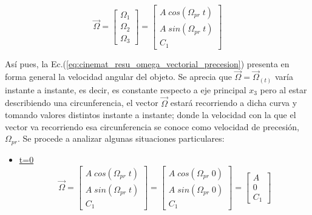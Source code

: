 \documentclass[oneside,a4paper,english,links]{amca}
\begin{document}
\begin{equation}
    \vec{\Omega}=
\begin{bmatrix}
\Omega_1\\
\Omega_2\\
\Omega_3
\end{bmatrix}=
\begin{bmatrix}
A \;cos\left(\Omega_{pr}\;t\right)\\
A \;sin\left(\Omega_{pr}\;t\right)\\
C_1
\end{bmatrix}    
\label{eq:cinemat_resu_omega_vectorial_precesion}
\end{equation}

As\'i pues, la Ec.(\ref{eq:cinemat_resu_omega_vectorial_precesion}) presenta en forma general la velocidad angular del objeto. Se aprecia que $\vec{\Omega}=\vec{\Omega}_{(t)}$ var\'ia instante a instante, es decir, es constante respecto a eje principal $x_3$ pero al estar describiendo una circunferencia, el vector $\vec{\Omega}$ estar\'a recorriendo a dicha curva y tomando valores distintos instante a instante; donde la velocidad con la que el vector va recorriendo esa circunferencia se conoce como velocidad de precesi\'on, $\Omega_{pr}$. Se procede a analizar algunas situaciones particulares:


\begin{itemize}
    \item \underline{t=0}\\
\begin{equation}
    \vec{\Omega}=
\begin{bmatrix}
A \;cos\left(\Omega_{pr}\;t\right)\\
A \;sin\left(\Omega_{pr}\;t\right)\\
C_1
\end{bmatrix}=
\begin{bmatrix}
A \;cos\left(\Omega_{pr}\;0\right)\\
A \;sin\left(\Omega_{pr}\;0\right)\\
C_1
\end{bmatrix}=
\begin{bmatrix}
A \\
0 \\
C_1
\end{bmatrix}
\label{eq:omega_t0}
\end{equation}
\end{itemize}
\end{document}
